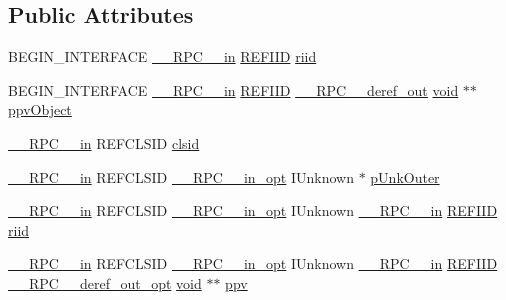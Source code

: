 \subsection*{Public Attributes}
\begin{DoxyCompactItemize}
\item 
B\+E\+G\+I\+N\+\_\+\+I\+N\+T\+E\+R\+F\+A\+CE \hyperlink{rpcsal_8h_a20b7f6da600a05c8b541659f14f7f0e6}{\+\_\+\+\_\+\+R\+P\+C\+\_\+\+\_\+in} \hyperlink{px__win__ds_8c_a80ec49c8ae61e234197d5071d2df497d}{R\+E\+F\+I\+ID} \hyperlink{struct_i_create_object_vtbl_a2ba5c3335dc733a64ef7447789db6f67}{riid}
\item 
B\+E\+G\+I\+N\+\_\+\+I\+N\+T\+E\+R\+F\+A\+CE \hyperlink{rpcsal_8h_a20b7f6da600a05c8b541659f14f7f0e6}{\+\_\+\+\_\+\+R\+P\+C\+\_\+\+\_\+in} \hyperlink{px__win__ds_8c_a80ec49c8ae61e234197d5071d2df497d}{R\+E\+F\+I\+ID} \hyperlink{rpcsal_8h_a23bc188526f10656f9c79d950f6c3192}{\+\_\+\+\_\+\+R\+P\+C\+\_\+\+\_\+deref\+\_\+out} \hyperlink{sound_8c_ae35f5844602719cf66324f4de2a658b3}{void} $\ast$$\ast$ \hyperlink{struct_i_create_object_vtbl_a07386253c8750a69c117882c22603b6c}{ppv\+Object}
\item 
\hyperlink{rpcsal_8h_a20b7f6da600a05c8b541659f14f7f0e6}{\+\_\+\+\_\+\+R\+P\+C\+\_\+\+\_\+in} R\+E\+F\+C\+L\+S\+ID \hyperlink{struct_i_create_object_vtbl_a5d0a5a43b7aef64ad03de0a4a81f2112}{clsid}
\item 
\hyperlink{rpcsal_8h_a20b7f6da600a05c8b541659f14f7f0e6}{\+\_\+\+\_\+\+R\+P\+C\+\_\+\+\_\+in} R\+E\+F\+C\+L\+S\+ID \hyperlink{rpcsal_8h_a6e152ac84637d70f0453366759b3b9fb}{\+\_\+\+\_\+\+R\+P\+C\+\_\+\+\_\+in\+\_\+opt} I\+Unknown $\ast$ \hyperlink{struct_i_create_object_vtbl_a098bce5009406995edcc8919d6ceab3d}{p\+Unk\+Outer}
\item 
\hyperlink{rpcsal_8h_a20b7f6da600a05c8b541659f14f7f0e6}{\+\_\+\+\_\+\+R\+P\+C\+\_\+\+\_\+in} R\+E\+F\+C\+L\+S\+ID \hyperlink{rpcsal_8h_a6e152ac84637d70f0453366759b3b9fb}{\+\_\+\+\_\+\+R\+P\+C\+\_\+\+\_\+in\+\_\+opt} I\+Unknown \hyperlink{rpcsal_8h_a20b7f6da600a05c8b541659f14f7f0e6}{\+\_\+\+\_\+\+R\+P\+C\+\_\+\+\_\+in} \hyperlink{px__win__ds_8c_a80ec49c8ae61e234197d5071d2df497d}{R\+E\+F\+I\+ID} \hyperlink{struct_i_create_object_vtbl_a51aa0b68f17b7a6545ae887cb6d6d38a}{riid}
\item 
\hyperlink{rpcsal_8h_a20b7f6da600a05c8b541659f14f7f0e6}{\+\_\+\+\_\+\+R\+P\+C\+\_\+\+\_\+in} R\+E\+F\+C\+L\+S\+ID \hyperlink{rpcsal_8h_a6e152ac84637d70f0453366759b3b9fb}{\+\_\+\+\_\+\+R\+P\+C\+\_\+\+\_\+in\+\_\+opt} I\+Unknown \hyperlink{rpcsal_8h_a20b7f6da600a05c8b541659f14f7f0e6}{\+\_\+\+\_\+\+R\+P\+C\+\_\+\+\_\+in} \hyperlink{px__win__ds_8c_a80ec49c8ae61e234197d5071d2df497d}{R\+E\+F\+I\+ID} \hyperlink{rpcsal_8h_ab29e89ceb0eb0b075c6f6299b0de6a21}{\+\_\+\+\_\+\+R\+P\+C\+\_\+\+\_\+deref\+\_\+out\+\_\+opt} \hyperlink{sound_8c_ae35f5844602719cf66324f4de2a658b3}{void} $\ast$$\ast$ \hyperlink{struct_i_create_object_vtbl_a6c2428e097234c69dd71b8cbb11b9649}{ppv}
\end{DoxyCompactItemize}



